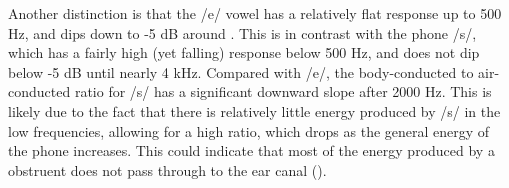 Another distinction is that the /e/ vowel has a relatively flat response up to 500 Hz, and dips down to -5 dB around \DIFdelbegin {}\DIFdelend \DIFaddbegin {}\DIFaddend .  This is in contrast with the phone /s/, which has a fairly high (yet falling) response below 500 Hz, and does not dip below -5 dB until nearly 4 kHz.  Compared with /e/, the body-conducted to air-conducted ratio for /s/ has a significant downward slope after 2000 Hz.  This is likely due to the fact that there is relatively little energy produced by /s/ in the low frequencies, allowing for a high ratio, which drops as the general energy of the phone increases.  This could indicate that most of the energy produced by a obstruent does not pass through to the ear canal (\cite{reinfeldt:10}).



